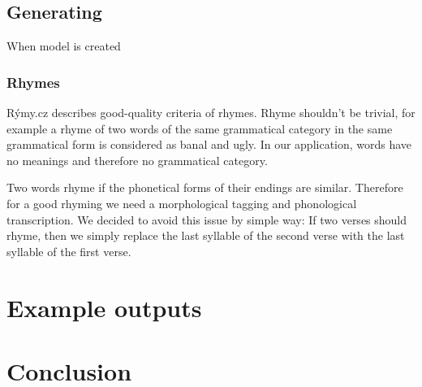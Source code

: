 \documentclass[a4]{article}
\begin{document}




\subsection{Generating}

When model is created

\subsubsection{Rhymes}


Rýmy.cz\cite{rymy} describes good-quality criteria of rhymes. Rhyme
shouldn't be trivial, for example a rhyme of two words of the same
grammatical category in the same grammatical form is considered as banal
and ugly. In our application, words have no meanings and therefore no
grammatical category.

Two words rhyme if the phonetical forms of their endings are similar. 
Therefore for a good rhyming we need a morphological tagging and
phonological transcription. We decided to avoid this issue by simple way:
If two verses should rhyme, then we simply replace the last syllable of the
second verse with the last syllable of the first verse.

\section{Example outputs}

\section{Conclusion}
\end{document}
